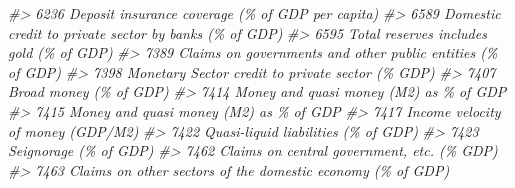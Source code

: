 \documentclass[
]{bxjsbook}
\newenvironment{Shaded}{\begin{snugshade}}{\end{snugshade}}
\newcommand{\CommentTok}[1]{\textcolor[rgb]{0.56,0.35,0.01}{\textit{#1}}}
\theoremstyle{definition}
\theoremstyle{definition}
\theoremstyle{definition}
\theoremstyle{definition}
\theoremstyle{remark}
\begin{document}
\begin{Shaded}
\begin{Highlighting}[]
\CommentTok{\#\textgreater{} 6236                                                                                                                           Deposit insurance coverage (\% of GDP per capita)}
\CommentTok{\#\textgreater{} 6589                                                                                                                      Domestic credit to private sector by banks (\% of GDP)}
\CommentTok{\#\textgreater{} 6595                                                                                                                                    Total reserves includes gold (\% of GDP)}
\CommentTok{\#\textgreater{} 7389                                                                                                                 Claims on governments and other public entities (\% of GDP)}
\CommentTok{\#\textgreater{} 7398                                                                                                                           Monetary Sector credit to private sector (\% GDP)}
\CommentTok{\#\textgreater{} 7407                                                                                                                                                     Broad money (\% of GDP)}
\CommentTok{\#\textgreater{} 7414                                                                                                                                     Money and quasi money (M2) as \% of GDP}
\CommentTok{\#\textgreater{} 7415                                                                                                                                     Money and quasi money (M2) as \% of GDP}
\CommentTok{\#\textgreater{} 7417                                                                                                                                          Income velocity of money (GDP/M2)}
\CommentTok{\#\textgreater{} 7422                                                                                                                                        Quasi{-}liquid liabilities (\% of GDP)}
\CommentTok{\#\textgreater{} 7423                                                                                                                                                      Seignorage (\% of GDP)}
\CommentTok{\#\textgreater{} 7462                                                                                                                                 Claims on central government, etc. (\% GDP)}
\CommentTok{\#\textgreater{} 7463                                                                                                                 Claims on other sectors of the domestic economy (\% of GDP)}

\end{Highlighting}
\end{Shaded}
\end{document}

